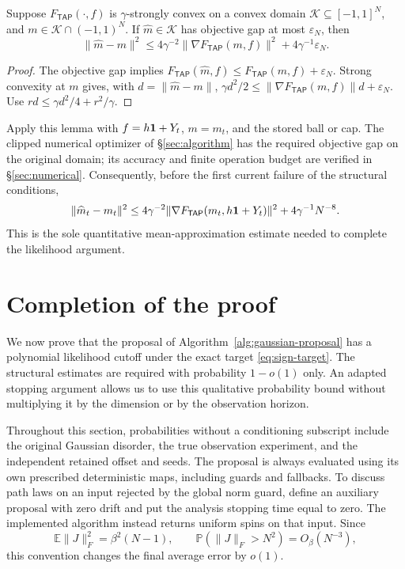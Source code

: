 \documentclass[11pt,reqno]{amsart}
\def\tap{{\mathsf{TAP}}}
\begin{document}
\begin{lem}\label{sampler:objective}
Suppose $ F_{\tap}(\cdot,f)$ is $\gamma$-strongly convex on a convex domain
$\mathcal K\subseteq[-1,1]^N$, and $m\in\mathcal K\cap(-1,1)^N$.
If $\widehat m\in\mathcal K$ has objective gap at most $\varepsilon_N$,
then
\begin{equation*}
 \|\widehat m-m\|^2
 \le4\gamma^{-2}\|\nabla F_{\tap}(m,f)\|^2
                      +4\gamma^{-1}\varepsilon_N.
\end{equation*}
\end{lem}
\begin{proof}
The objective gap implies $ F_{\tap}(\widehat m,f)\le F_{\tap}(m,f)+\varepsilon_N$.
Strong convexity at $m$ gives, with $d=\|\widehat m-m\|$,
$\gamma d^2/2\le\|\nabla F_{\tap}(m,f)\|d+\varepsilon_N$.
Use $rd\le\gamma d^2/4+r^2/\gamma$.
\end{proof}

Apply this lemma with $f=h{\boldsymbol{1}}+Y_t$, $m=m_t$, and the stored ball or cap. The clipped numerical optimizer of \S\ref{sec:algorithm} has the required objective gap on the original domain; its accuracy and finite operation budget are verified in \S\ref{sec:numerical}. Consequently, before the first current failure of the structural conditions,
\[
 \|\widehat m_t-m_t\|^2
 \le4\gamma^{-2}\|\nabla F_{\tap}(m_t,h\bone+Y_t)\|^2
                    +4\gamma^{-1}N^{-8}.
\]
This is the sole quantitative mean-approximation estimate needed to complete the likelihood argument.


\section{Completion of the proof}\label{sec:completion}

We now prove that the proposal of Algorithm~\ref{alg:gaussian-proposal}
has a polynomial likelihood cutoff under the exact target
\eqref{eq:sign-target}. The structural estimates are required with
probability $1-o(1)$ only. An adapted stopping argument allows us to use
this qualitative probability bound without multiplying it by the
dimension or by the observation horizon.

Throughout this section, probabilities without a conditioning subscript
include the original Gaussian disorder, the true observation experiment,
and the independent retained offset and seeds. The proposal is always
evaluated using its own prescribed deterministic maps, including guards
and fallbacks. To discuss path laws on an input rejected by the global
norm guard, define an auxiliary proposal with zero drift and put the
analysis stopping time equal to zero. The implemented algorithm instead
returns uniform spins on that input. Since
\[
 \mathbb E\|J\|_F^2=\beta^2(N-1),\qquad
 \mathbb P(\|J\|_F>N^2)=O_\beta(N^{-3}),
\]
this convention changes the final average error by $o(1)$.
\end{document}

